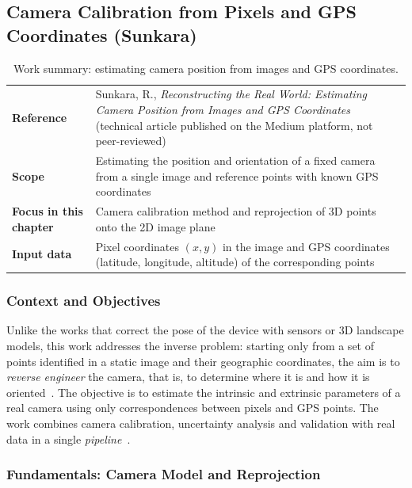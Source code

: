 \subsection{Camera Calibration from Pixels and GPS Coordinates (Sunkara)}
\label{sec:sunkara}

\begin{table}[htbp]
\centering
\caption{Work summary: estimating camera position from images and GPS coordinates.}
\label{tab:ficha_sunkara}
\small
\begin{tabular}{p{3.2cm}p{9.8cm}}
\hline
\textbf{Reference} & Sunkara, R., \textit{Reconstructing the Real World: Estimating Camera Position from Images and GPS Coordinates}~\cite{sunkara2025} (technical article published on the Medium platform, not peer-reviewed) \\
\textbf{Scope} & Estimating the position and orientation of a fixed camera from a single image and reference points with known GPS coordinates \\
\textbf{Focus in this chapter} & Camera calibration method and reprojection of 3D points onto the 2D image plane \\
\textbf{Input data} & Pixel coordinates $(x, y)$ in the image and GPS coordinates (latitude, longitude, altitude) of the corresponding points \\
\hline
\end{tabular}
\end{table}

\subsubsection{Context and Objectives}

Unlike the works that correct the pose of the device with sensors or 3D landscape models, this work addresses the inverse problem: starting only from a set of points identified in a static image and their geographic coordinates, the aim is to \textit{reverse engineer} the camera, that is, to determine where it is and how it is oriented~\cite{sunkara2025}. The objective is to estimate the intrinsic and extrinsic parameters of a real camera using only correspondences between pixels and GPS points. The work combines camera calibration, uncertainty analysis and validation with real data in a single \textit{pipeline}~\cite{sunkara2025}.

\subsubsection{Fundamentals: Camera Model and Reprojection}
\label{sec:fundamentos_reprojecao}

